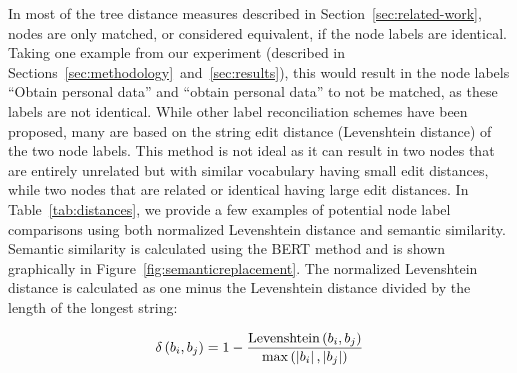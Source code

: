 In most of the tree distance measures described in Section~\ref{sec:related-work}, nodes are only matched, or considered equivalent, if the node labels are identical. Taking one example from our experiment (described in Sections~\ref{sec:methodology}~and~\ref{sec:results}), this would result in the node labels ``Obtain personal data'' and ``obtain personal data'' to not be matched, as these labels are not identical. While other label reconciliation schemes have been proposed, many are based on the string edit distance (Levenshtein distance) of the two node labels. This method is not ideal as it can result in two nodes that are entirely unrelated but with similar vocabulary having small edit distances, while two nodes that are related or identical having large edit distances. In Table~\ref{tab:distances}, we provide a few examples of potential node label comparisons using both normalized Levenshtein distance and semantic similarity. Semantic similarity is calculated using the BERT method and is shown graphically in Figure~\ref{fig:semanticreplacement}. The normalized Levenshtein distance is calculated as one minus the Levenshtein distance divided by the length of the longest string:

\[
\delta\left(\ATlabel{d}{i}, \ATlabel{e}{j}\right) = 1 - \frac{\text{Levenshtein}\left(\ATlabel{d}{i}, \ATlabel{e}{j}\right)}{\max\left(\left|\ATlabel{d}{i}\right|, \left|\ATlabel{e}{j}\right|\right)}
\]



